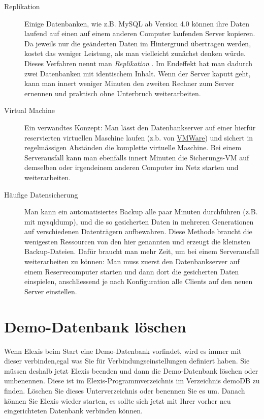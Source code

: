 \begin{description}
\item[ Replikation ] Einige Datenbanken, wie z.B. MySQL ab Version 4.0 können ihre Daten laufend auf einen
auf einem anderen Computer laufenden Server kopieren. Da jeweils nur die geänderten Daten im Hintergrund
übertragen werden, kostet das weniger Leistung, als man vielleicht zunächst denken würde. Dieses Verfahren
nennt man \textit{Replikation} . Im Endeffekt hat man dadurch zwei Datenbanken mit identischem Inhalt.
Wenn der Server kaputt geht, kann man innert weniger Minuten den zweiten Rechner zum Server ernennen und
praktisch ohne Unterbruch weiterarbeiten.
\item [Virtual Machine] Ein verwandtes Konzept: Man lässt den Datenbankserver auf einer hierfür reservierten
 virtuellen Maschine laufen (z.b. von \href{http://www.vmware.com/}{VMWare}) und sichert in regelmässigen
 Abständen die komplette virtuelle Maschine. Bei einem Serverausfall kann man ebenfalls innert Minuten die
 Sicherungs-VM auf demselben oder irgendeinem anderen Computer im Netz starten und weiterarbeiten.
\item [Häufige Datensicherung] Man kann ein automatisiertes Backup alle paar Minuten durchführen
 (z.B. mit mysqldump), und die so gesicherten Daten in mehreren Generationen auf verschiedenen Datenträgern
 aufbewahren. Diese Methode braucht die wenigesten Ressourcen von den hier genannten und erzeugt die kleinsten
 Backup-Dateien. Dafür braucht man mehr Zeit, um bei einem Serverausfall weiterarbeiten zu können: Man muss
 zuerst den Datenbankserver auf einem Reservecomputer starten und dann dort die gesicherten Daten einspielen,
 anschliessend je nach Konfiguration alle Clients auf den neuen Server einstellen.
\end{description}

\section{Demo-Datenbank löschen}
Wenn Elexis beim Start eine Demo-Datenbank vorfindet, wird es immer mit dieser
verbinden,egal was Sie für Verbindungseinstellungen definiert haben. Sie müssen
deshalb jetzt Elexis beenden und dann die Demo-Datenbank löschen oder
umbenennen. Diese ist im Elexis-Programmverzeichnis im Verzeichnis \glqq
demoDB\grqq{} zu finden. Löschen Sie dieses Unterverzeichnis oder benennen Sie
es um. Danach können Sie Elexis wieder starten, es sollte sich jetzt mit Ihrer
vorher neu eingerichteten Datenbank verbinden können.

